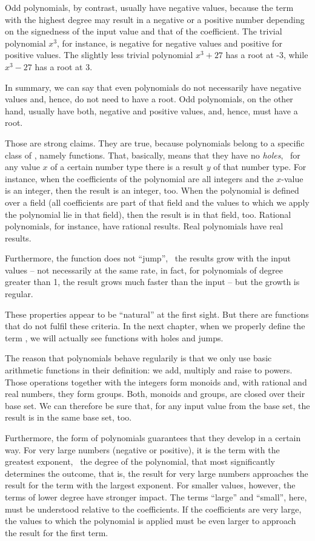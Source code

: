 \documentclass[tikz]{scrreprt}
\begin{document}
Odd polynomials, by contrast, usually have negative values, because
the term with the highest degree may result in a negative or a
positive number depending on the signedness of the input value
and that of the coefficient.
The trivial polynomial $x^3$, for instance, is negative for
negative values and positive for positive values. The slightly
less trivial polynomial $x^3 + 27$ has a root at -3, while
$x^3 - 27$ has a root at 3.

In summary, we can say that even polynomials do not necessarily
have negative values and, hence, do not need to have a root.
Odd polynomials, on the other hand, usually have both, negative
and positive values, and, hence, must have a root.

Those are strong claims. They are true, because polynomials
belong to a specific class of , 
namely  functions.
That, basically, means that they have no \emph{holes}, \ie\
for any value $x$ of a certain number type there is a result $y$
of that number type. For instance, when the coefficients of the
polynomial are all integers and the $x$-value is an integer,
then the result is an integer, too. When the polynomial is defined
over a field (all coefficients are part of that field and
the values to which we apply the polynomial lie in that field),
then the result is in that field, too. Rational polynomials,
for instance, have rational results. 
Real polynomials have real results.

Furthermore, the function does not ``jump'', \ie\ the results
grow with the input values -- not necessarily
at the same rate, in fact, for polynomials of degree greater than 1,
the result grows much faster than the input -- but the growth
is regular.

These properties appear to be ``natural'' at the first sight.
But there are functions that do not fulfil these criteria.
In the next chapter, when we properly define the term ,
we will actually see functions with holes and jumps.

The reason that polynomials behave regularily is that we only
use basic arithmetic functions in their definition: we add, multiply
and raise to powers. 
Those operations together with the integers form monoids and,
with rational and real numbers, they form groups.
Both, monoids and groups, are closed over their base set.
We can therefore be sure that, for any input value from the base set,
the result is in the same base set, too.

Furthermore, the form of polynomials guarantees that they develop
in a certain way. For very large numbers (negative or positive), 
it is the term with the greatest exponent, \ie\ the degree 
of the polynomial, that most significantly determines the
outcome, that is, the result for very large numbers
approaches the result for the term with the largest exponent. 
For smaller values, however, the terms of lower degree have
stronger impact. The terms ``large'' and ``small'', here, 
must be understood relative to the coefficients. If the coefficients
are very large, the values to which the polynomial is applied
must be even larger to approach the result for the first term.
\end{document}
